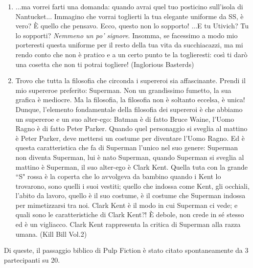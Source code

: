 \documentclass[12pt]{article} %
\begin{document}
\begin{flushleft}
\begin{enumerate}
    \item ...ma vorrei farti una domanda: quando avrai quel tuo posticino sull'isola di Nantucket... Immagino che vorrai toglierti la tua elegante uniforme da SS, è vero?  È quello che pensavo. Ecco, questo non lo sopporto! ...E tu Utivich? Tu lo sopporti? \textit{Nemmeno un po' signore}. Insomma, se facessimo a modo mio porteresti questa uniforme per il resto della tua vita da succhiacazzi, ma mi rendo conto che non è pratico e a un certo punto te la toglieresti: così ti darò una cosetta che non ti potrai togliere! (Inglorious Basterds)
    \item Trovo che tutta la filosofia che circonda i supereroi sia affascinante. Prendi il mio supereroe preferito: Superman. Non un grandissimo fumetto, la sua grafica è mediocre. Ma la filosofia, la filosofia non è soltanto eccelsa, è unica! Dunque, l'elemento fondamentale della filosofia dei supereroi è che abbiamo un supereroe e un suo alter-ego: Batman è di fatto Bruce Waine, l'Uomo Ragno è di fatto Peter Parker. Quando quel personaggio si sveglia al mattino è Peter Parker, deve mettersi un costume per diventare l'Uomo Ragno. Ed è questa caratteristica che fa di Superman l'unico nel suo genere: Superman non diventa Superman, lui è nato Superman, quando Superman si sveglia al mattino è Superman, il suo alter-ego è Clark Kent. Quella tuta con la grande ``S" rossa è la coperta che lo avvolgeva da bambino quando i Kent lo trovarono, sono quelli i suoi vestiti; quello che indossa come Kent, gli occhiali, l'abito da lavoro, quello è il suo costume, è il costume che Superman indossa per mimetizzarsi tra noi. Clark Kent è il modo in cui Superman ci vede; e quali sono le caratteristiche di Clark Kent?! È debole, non crede in sé stesso ed è un vigliacco. Clark Kent rappresenta la critica di Superman alla razza umana. (Kill Bill Vol.2)
\end{enumerate}
Di queste, il passaggio biblico di Pulp Fiction è stato citato spontaneamente da 3 partecipanti su 20.

\end{flushleft}
\break

\renewcommand{\refname}{}
\end{document}
